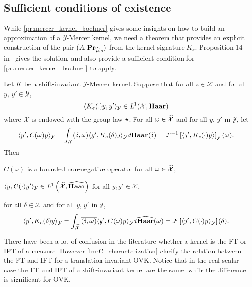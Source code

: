 \subsection{Sufficient conditions of existence}
\label{subsec:sufficient_conditions}
While \cref{pr:mercer_kernel_bochner} gives some insights on how to build an
approximation of a $\mathcal{Y}$-Mercer kernel, we need a theorem that provides
an explicit construction of the pair $(A, {\mathbf{{Pr}}}_{\widehat{\mu},\rho})$ from
the kernel signature $K_e$. Proposition 14 in~\citet{Carmeli2010} gives the
solution, and also provide a sufficient condition for
\cref{pr:mercer_kernel_bochner} to apply.
\begin{proposition}
    \label{pr:inverse_ovk_Fourier_decomposition}
    Let $K$ be a shift-invariant $\mathcal{Y}$-Mercer kernel. %
    Suppose that for all $z \in \mathcal{X}$ and for all $y$, $y'
    \in\mathcal{Y}$,
    \begin{dmath*}
        \inner{K_e(.)y,y'}_{\mathcal{Y}}\in L^1(\mathcal{X},\Haar)
    \end{dmath*}
    where $\mathcal{X}$ is endowed with the group law $\star$. For all
    $\omega \in \widehat{\mathcal{X}}$ and for all $y$, $y'$ in $\mathcal{Y}$, let
    \begin{dmath}\label{eq:CK0}
        \inner{y',C(\omega)y}_{\mathcal{Y}}= \int_{\mathcal{X}}
        \pairing{\delta, \omega}\inner{y',
        K_e(\delta)y}_{\mathcal{Y}}d\Haar(\delta) = \IFT{\inner{y',
        K_e(\cdot)y}}_{\mathcal{Y}}(\omega).
    \end{dmath}
    Then
    \begin{propenum}
        \item $C(\omega)$ is a bounded non-negative operator for all $\omega
        \in \widehat{\mathcal{X}}$, 
        \item $\langle y, C(\cdot)y'\rangle_{\mathcal{Y}}\in
        L^1\left(\widehat{\mathcal{X}},\widehat{\mathbf{Haar}}\right)$ for all
        $y,y'\in\mathcal{X}$,
        \item for all $\delta\in\mathcal{X}$ and for all $y$, $y'$ in
        $\mathcal{Y}$,
        \begin{dmath*}
            \inner{y', K_e(\delta)y}_{\mathcal{Y}}=
            \int_{\dual{\mathcal{X}}}\conj{\pairing{\delta,\omega}}\inner{y',
            C(\omega)y}_{\mathcal{Y}}d\dual{\Haar}(\omega) =\FT{\inner{y',
            C(\cdot)y}_{\mathcal{Y}}}(\delta).
        \end{dmath*}
    \end{propenum}
\end{proposition}
There have been a lot of confusion in the literature whether a kernel is the
\acl{FT} or \acl{IFT} of a measure. However \cref{lm:C_characterization}
clarify the relation between the \acl{FT} and \acl{IFT} for a translation
invariant \acl{OVK}. Notice that in the real scalar case the \acl{FT} and
\acl{IFT} of a shift-invariant kernel are the same, while the difference is
significant for \acs{OVK}.
